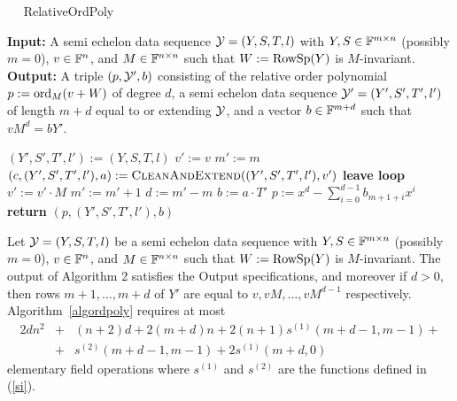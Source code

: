 \begin{algorithm}[t]
\caption{$\quad$ \sc RelativeOrdPoly}
\label{algordpoly}
\begin{algorithmic}
\STATE \textbf{Input:} A semi echelon data sequence $\mathcal{Y}=(Y,S,T,l)$ with 
$Y,S \in \mathbb{F}^{m \times n}$ (possibly $m=0$),
$v \in \mathbb{F}^n$, 
and $M \in \mathbb{F}^{n \times n}$ such that $W:=\mathrm{RowSp}(Y)$ is $M$-invariant.
\STATE \textbf{Output:} A triple $(p,\mathcal{Y}',b)$ consisting of the
relative order polynomial $p := \mathrm{ord}_M(v+W)$ of degree $d$,
a semi echelon data sequence $\mathcal{Y}'=(Y',S',T',l')$ of length $m+d$ equal
to or extending $\mathcal{Y}$, and a vector $b \in \mathbb{F}^{m+d}$ such that $vM^d =
bY'$.

\vspace*{2mm}
\STATE $(Y',S',T',l') := (Y,S,T,l)$ \hspace*{2mm}
\STATE $v' := v$
\STATE $m' := m$ \hspace*{3.08cm}  
\LOOP
    \STATE $(c,(Y',S',T',l'),a) := \mbox{\sc CleanAndExtend}((Y',S',T',l'),v')$  
    \STATE \hspace*{5cm} 
        \STATE \textbf{leave loop}
    \ENDIF
    \STATE $v' := v' \cdot M$
     \STATE $m' := m' +1$	
\ENDLOOP \hspace*{1.5cm}  
\STATE $d := m'-m$
\STATE $b := a\cdot T'$
\STATE $p :=x^d-\sum_{i=0}^{d-1} b_{m+1+i} x^i$
\STATE \textbf{return} $(p, (Y',S',T',l'),b)$
\end{algorithmic}
\end{algorithm}

\begin{Prop}
\label{proprelorderpol}

\mbox{}\par
Let $\mathcal{Y}=(Y,S,T,l)$ be a semi echelon data sequence with $Y,S \in \mathbb{F}^{m \times
n}$ (possibly $m=0$), $v \in \mathbb{F}^n$, and $M \in \mathbb{F}^{n \times n}$
such that $W:=\mathrm{RowSp}(Y)$ is $M$-invariant. 
The output of Algorithm 2 satisfies the Output specifications, and
moreover if $d>0$, then
rows $m+1, \ldots, m+d$ of $Y'$ are equal to $v,vM,\ldots,vM^{d-1}$
respectively.
Algorithm~\ref{algordpoly} requires at most
\begin{eqnarray*}
2dn^2 &+& (n+2)d +2(m+d)n 
+ 2(n+1)s^{(1)}(m+d-1,m-1) +  \\
 &+& s^{(2)}(m+d-1,m-1) 
+ 2s^{(1)}(m+d,0)
\end{eqnarray*}
elementary field operations where $s^{(1)}$ and $s^{(2)}$ are the
functions defined in (\ref{si}).
\end{Prop}

